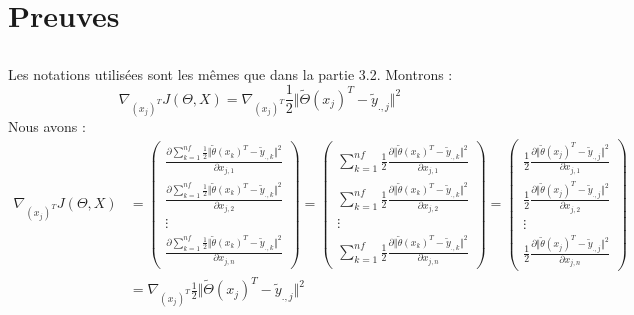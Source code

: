 \documentclass[a4paper,10pt]{article}
\begin{document}
\section{Preuves}
\subsection{}  
\label{P1}
Les notations utilisées sont les mêmes que dans la partie 3.2. Montrons : \[\nabla_{(x_{j})^T} J(\Theta, X) = \nabla_{(x_{j})^T}\frac{1}{2}\Vert\tilde{\Theta}(x_{j})^{T}-\tilde{y}_{.,j}\Vert^{2}\]
Nous avons :
\begin{align*}
\nabla_{(x_{j})^T} J(\Theta, X) &=  
\begin{pmatrix}  
\displaystyle\frac{\partial \displaystyle\sum_{k=1}^{nf}\frac{1}{2}\Vert\tilde{\theta}(x_{k})^{T}-\tilde{y}_{.,k}\Vert^{2}}{\partial x_{j,1}}\\  
\displaystyle\frac{\partial \displaystyle\sum_{k=1}^{nf}\frac{1}{2}\Vert\tilde{\theta}(x_{k})^{T}-\tilde{y}_{.,k}\Vert^{2}}{\partial x_{j,2}}\\  
\vdots\\  
\displaystyle\frac{\partial \displaystyle\sum_{k=1}^{nf}\frac{1}{2}\Vert\tilde{\theta}(x_{k})^{T}-\tilde{y}_{.,k}\Vert^{2}}{\partial x_{j,n}}  
\end{pmatrix}  
=  
\begin{pmatrix}  
\displaystyle\sum_{k=1}^{nf}  
\frac{1}{2}\frac{\partial\Vert\tilde{\theta}(x_{k})^{T}-\tilde{y}_{.,k}\Vert^{2}}{\partial x_{j,1}}\\  
\displaystyle\sum_{k=1}^{nf}  
\frac{1}{2}\frac{\partial\Vert\tilde{\theta}(x_{k})^{T}-\tilde{y}_{.,k}\Vert^{2}}{\partial x_{j,2}}\\  
\vdots\\  
\displaystyle\sum_{k=1}^{nf}  
\frac{1}{2}\frac{\partial\Vert\tilde{\theta}(x_{k})^{T}-\tilde{y}_{.,k}\Vert^{2}}{\partial x_{j,n}}  
\end{pmatrix}  
=  
\begin{pmatrix}  
\displaystyle  
\frac{1}{2}\frac{\partial\Vert\tilde{\theta}(x_{j})^{T}-\tilde{y}_{.,j}\Vert^{2}}{\partial x_{j,1}}\\  
\displaystyle  
\frac{1}{2}\frac{\partial\Vert\tilde{\theta}(x_{j})^{T}-\tilde{y}_{.,j}\Vert^{2}}{\partial x_{j,2}}\\  
\vdots\\  
\displaystyle  
\frac{1}{2}\frac{\partial\Vert\tilde{\theta}(x_{j})^{T}-\tilde{y}_{.,j}\Vert^{2}}{\partial x_{j,n}}  
\end{pmatrix}\\
&=  
\displaystyle  
\nabla_{(x_{j})^T}\frac{1}{2}\Vert\tilde{\Theta}(x_{j})^{T}-\tilde{y}_{.,j}\Vert^{2}
\end{align*}\\
\end{document}
